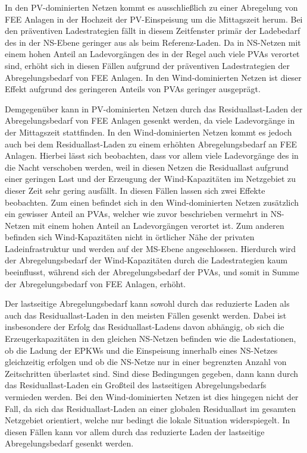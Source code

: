 In den \gls{PV}-dominierten Netzen kommt es ausschließlich zu einer Abregelung von \gls{FEE} Anlagen in der Hochzeit der \gls{PV}-Einspeisung um die Mittagszeit herum.
Bei den präventiven Ladestrategien fällt in diesem Zeitfenster primär der Ladebedarf des \UCs \zH in der \gls{NS}-Ebene geringer aus als beim Referenz-Laden.
Da in \gls{NS}-Netzen mit einem hohen Anteil an Ladevorgängen des \UCs \zH in der Regel auch viele \glspl{PVA} verortet sind, erhöht sich in diesen Fällen aufgrund der präventiven Ladestrategien der Abregelungsbedarf von \gls{FEE} Anlagen.
In den Wind-dominierten Netzen ist dieser Effekt aufgrund des geringeren Anteils von \glspl{PVA} geringer ausgeprägt.\medskip

Demgegenüber kann in \gls{PV}-dominierten Netzen durch das Residuallast-Laden der Abregelungsbedarf von \gls{FEE} Anlagen gesenkt werden, da viele Ladevorgänge in der Mittagszeit stattfinden.
In den Wind-dominierten Netzen kommt es jedoch auch bei dem Residuallast-Laden zu einem erhöhten Abregelungsbedarf an \gls{FEE} Anlagen.
Hierbei lässt sich beobachten, dass vor allem viele Ladevorgänge des \UCs \zH in die Nacht verschoben werden, weil in diesen Netzen die Residuallast aufgrund einer geringen Last und der Erzeugung der Wind-Kapazitäten im Netzgebiet zu dieser Zeit sehr gering ausfällt.
In diesen Fällen lassen sich zwei Effekte beobachten.
Zum einen befindet sich in den Wind-dominierten Netzen zusätzlich ein gewisser Anteil an \glspl{PVA}, welcher wie zuvor beschrieben vermehrt in \gls{NS}-Netzen mit einem hohen Anteil an Ladevorgängen verortet ist.
Zum anderen befinden sich Wind-Kapazitäten nicht in örtlicher Nähe der privaten Ladeinfrastruktur und werden auf der \gls{MS}-Ebene angeschlossen.
Hierdurch wird der Abregelungsbedarf der Wind-Kapazitäten durch die Ladestrategien kaum beeinflusst, während sich der Abregelungsbedarf der \glspl{PVA}, und somit in Summe der Abregelungsbedarf von \gls{FEE} Anlagen, erhöht.\medskip

Der lastseitige Abregelungsbedarf kann sowohl durch das reduzierte Laden als auch das Residuallast-Laden in den meisten Fällen gesenkt werden.
Dabei ist insbesondere der Erfolg das Residuallast-Ladens davon abhängig, ob sich die Erzeugerkapazitäten in den gleichen \gls{NS}-Netzen befinden wie die Ladestationen, ob die Ladung der \glspl{EPKW} und die Einspeisung innerhalb eines \gls{NS}-Netzes gleichzeitig erfolgen und ob die \gls{NS}-Netze nur in einer begrenzten Anzahl von Zeitschritten überlastet sind.
Sind diese Bedingungen gegeben, dann kann durch das Residuallast-Laden ein Großteil des lastseitigen Abregelungsbedarfs vermieden werden.
Bei den Wind-dominierten Netzen ist dies hingegen nicht der Fall, da sich das Residuallast-Laden an einer globalen Residuallast im gesamten Netzgebiet orientiert, welche nur bedingt die lokale Situation widerspiegelt.
In diesen Fällen kann vor allem durch das reduzierte Laden der lastseitige Abregelungsbedarf gesenkt werden.\medskip

